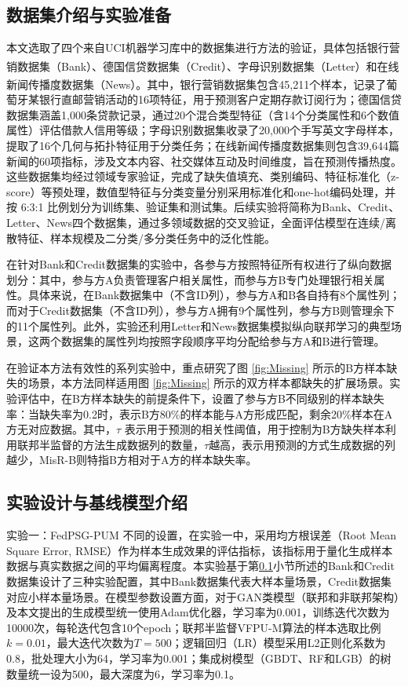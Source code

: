 \subsection{数据集介绍与实验准备} \label{subsec:data_experiment}
本文选取了四个来自UCI机器学习库中的数据集进行方法的验证，具体包括银行营销数据集（Bank）、德国信贷数据集（Credit）、字母识别数据集（Letter）\textsuperscript{\cite{serbian}}和在线新闻传播度数据集（News）\textsuperscript{\cite{news}}。其中，银行营销数据集包含45,211个样本，记录了葡萄牙某银行直邮营销活动的16项特征，用于预测客户定期存款订阅行为；德国信贷数据集涵盖1,000条贷款记录，通过20个混合类型特征（含14个分类属性和6个数值属性）评估借款人信用等级；字母识别数据集收录了20,000个手写英文字母样本，提取了16个几何与拓扑特征用于分类任务；在线新闻传播度数据集则包含39,644篇新闻的60项指标，涉及文本内容、社交媒体互动及时间维度，旨在预测传播热度。这些数据集均经过领域专家验证，完成了缺失值填充、类别编码、特征标准化（z-score）等预处理，数值型特征与分类变量分别采用标准化和one-hot编码处理，并按 6:3:1 比例划分为训练集、验证集和测试集。后续实验将简称为Bank、Credit、Letter、News四个数据集，通过多领域数据的交叉验证，全面评估模型在连续/离散特征、样本规模及二分类/多分类任务中的泛化性能。

在针对Bank和Credit数据集的实验中，各参与方按照特征所有权进行了纵向数据划分：其中，参与方A负责管理客户相关属性，而参与方B专门处理银行相关属性。具体来说，在Bank数据集中（不含ID列），参与方A和B各自持有8个属性列；而对于Credit数据集（不含ID列），参与方A拥有9个属性列，参与方B则管理余下的11个属性列。此外，实验还利用Letter和News数据集模拟纵向联邦学习的典型场景，这两个数据集的属性列均按照字段顺序平均分配给参与方A和B进行管理。

在验证本方法有效性的系列实验中，重点研究了图 \ref{fig:Missing} 所示的B方样本缺失的场景，本方法同样适用图 \ref{fig:Missing} 所示的双方样本都缺失的扩展场景。实验评估中，在B方样本缺失的前提条件下，设置了参与方B不同级别的样本缺失率：当缺失率为0.2时，表示B方80\%的样本能与A方形成匹配，剩余20\%样本在A方无对应数据。其中，$\tau$ 表示用于预测的相关性阈值，用于控制为B方缺失样本利用联邦半监督的方法生成数据列的数量，$\tau$越高，表示用预测的方式生成数据的列越少，MisR-B则特指B方相对于A方的样本缺失率。
\subsection{实验设计与基线模型介绍}
实验一：FedPSG-PUM 不同的设置，在实验一中，采用均方根误差（Root Mean Square Error, RMSE）作为样本生成效果的评估指标，该指标用于量化生成样本数据与真实数据之间的平均偏离程度。本实验基于第\ref{subsec:data_experiment}小节所述的Bank和Credit数据集设计了三种实验配置，其中Bank数据集代表大样本量场景，Credit数据集对应小样本量场景。在模型参数设置方面，对于GAN类模型（联邦和非联邦架构）及本文提出的生成模型统一使用Adam优化器，学习率为0.001，训练迭代次数为10000次，每轮迭代包含10个epoch；联邦半监督VFPU-M算法的样本选取比例$k=0.01$，最大迭代次数为$T=500$；逻辑回归（LR）模型采用L2正则化系数为0.8，批处理大小为64，学习率为0.001；集成树模型（GBDT、RF和LGB）的树数量统一设为500，最大深度为6，学习率为0.1。

